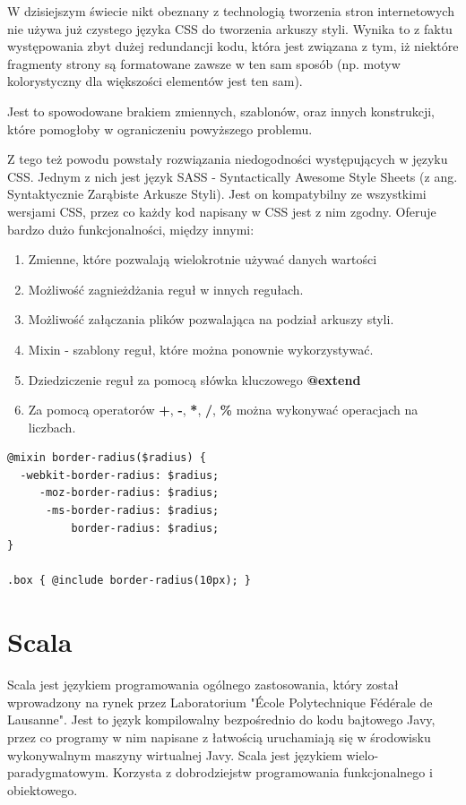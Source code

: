 W dzisiejszym świecie nikt obeznany z technologią tworzenia stron internetowych nie używa już czystego języka CSS do tworzenia arkuszy styli. 
Wynika to z faktu występowania zbyt dużej redundancji kodu, która jest związana z tym, iż niektóre fragmenty strony są formatowane zawsze w ten sam sposób (np. motyw kolorystyczny dla większości elementów jest ten sam). 

Jest to spowodowane brakiem zmiennych, szablonów, oraz innych konstrukcji, które pomogłoby w ograniczeniu powyższego problemu. 

Z tego też powodu powstały rozwiązania niedogodności występujących w języku CSS. Jednym z nich jest język SASS - Syntactically Awesome Style Sheets (z ang. Syntaktycznie Zarąbiste Arkusze Styli)\cite{Sass}. Jest on kompatybilny ze wszystkimi wersjami CSS, przez co każdy kod napisany w CSS jest z nim zgodny. Oferuje bardzo dużo funkcjonalności, między innymi:
\begin{enumerate}
	\item Zmienne, które pozwalają wielokrotnie używać danych wartości
	\item Możliwość zagnieżdżania reguł w innych regułach.
	\item Możliwość załączania plików pozwalająca na podział arkuszy styli.
	\item Mixin - szablony reguł, które można ponownie wykorzystywać.
	\item Dziedziczenie reguł za pomocą słówka kluczowego \textbf{@extend}
	\item Za pomocą operatorów \textbf{+}, \textbf{-}, \textbf{*}, \textbf{/}, \textbf{\%} można wykonywać operacjach na liczbach.
\end{enumerate}


\begin{lstlisting}[frame=single, numbers=none,captionpos=b, 
caption={Przykładowy kod SCSS wykorzystujący mixin.}]
@mixin border-radius($radius) {
  -webkit-border-radius: $radius;
     -moz-border-radius: $radius;
      -ms-border-radius: $radius;
          border-radius: $radius;
}

.box { @include border-radius(10px); }
\end{lstlisting}

\newpage
{\let\cleardoublepage\relax \chapter{Scala}}

Scala\cite{ScalaWiki} jest językiem programowania ogólnego zastosowania, który został wprowadzony na rynek przez Laboratorium "École Polytechnique Fédérale de Lausanne". Jest to język kompilowalny bezpośrednio do kodu bajtowego Javy, przez co programy w nim napisane z łatwością uruchamiają się w środowisku wykonywalnym maszyny wirtualnej Javy. 
Scala jest językiem wielo-paradygmatowym\cite{ScalaTour}. Korzysta z dobrodziejstw programowania funkcjonalnego i obiektowego.

